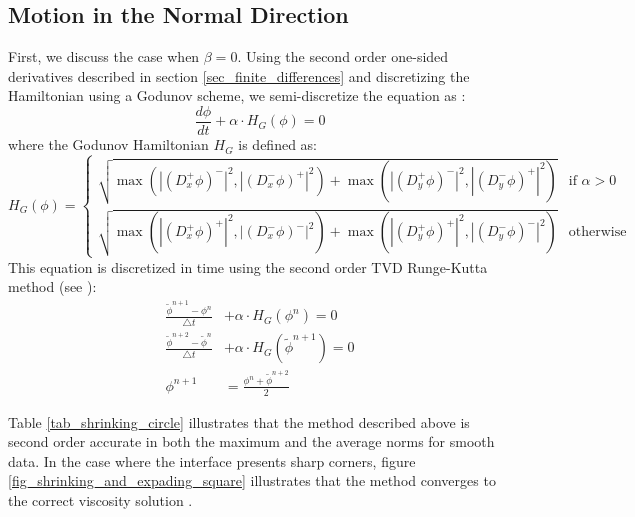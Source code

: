 \documentclass[english]{article}
\begin{document}
\subsection{Motion in the Normal Direction}
First, we discuss the case when $\beta=0$. Using the second order one-sided derivatives described
in section \ref{sec_finite_differences} and discretizing the Hamiltonian using a Godunov scheme, we
semi-discretize the equation as :
$$\frac{d\phi}{dt} + \alpha\cdot H_G(\phi)=0$$
where the Godunov Hamiltonian $H_G$ is defined as:
$$H_G(\phi) =
\begin{cases}
\sqrt{\max(|(D_x^+\phi)^-|^2,|(D_x^-\phi)^+|^2)+\max(|(D_y^+\phi)^-|^2,|(D_y^-\phi)^+|^2)}&\text{if $\alpha>0$}\\
\sqrt{\max(|(D_x^+\phi)^+|^2,|(D_x^-\phi)^-|^2)+\max(|(D_y^+\phi)^+|^2,|(D_y^-\phi)^-|^2)}&\text{otherwise}
\end{cases}$$
This equation is discretized in time using the second order TVD Runge-Kutta method (see
\cite{Shu:1988:ENO,liu:1996:WENO}):
\begin{align}
\frac{\tilde{\phi}^{n+1}-       \phi ^n}{\triangle t} &+ \alpha\cdot H_G\left(\phi^n\right)=0 \\
\frac{\tilde{\phi}^{n+2}-\tilde{\phi}^n}{\triangle t} &+ \alpha\cdot H_G\left(\tilde{\phi}^{n+1}\right)=0 \\
\phi^{n+1}&=\frac{\phi^n+\tilde{\phi}^{n+2}}2
\end{align}

Table \ref{tab_shrinking_circle} illustrates that the method described above is second order
accurate in both the maximum and the average norms for smooth data. In the case where the interface
presents sharp corners, figure \ref{fig_shrinking_and_expading_square} illustrates that the method
converges to the correct viscosity solution \cite{osher:1988:originallevelset}.
\end{document}
